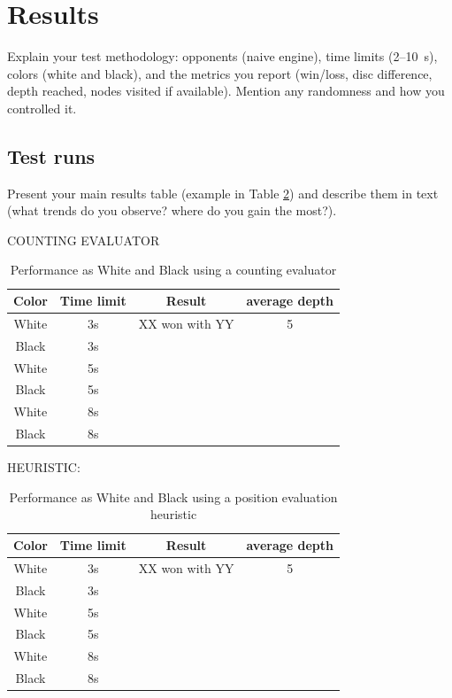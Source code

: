 \documentclass[10pt, titlepage, oneside, a4paper]{article}
\begin{document}
\section{Results}
\label{sec:results}
Explain your test methodology: opponents (naive engine), time limits (2--10~s), colors (white and black), and the metrics you report (win/loss, disc difference, depth reached, nodes visited if available).
Mention any randomness and how you controlled it.


\subsection{Test runs}
\label{sec:testruns}
Present your main results table (example in Table \ref{tab:othello-results}) and describe them in text (what trends do you observe? where do you gain the most?).

COUNTING EVALUATOR

\begin{table}[h]
    \centering
    \caption{Performance as White and Black using a counting evaluator}
    \begin{tabular}{cccc}
    \hline
    \textbf{Color} & \textbf{Time limit} & \textbf{Result}&\textbf{ average depth} \\
    \hline
    White & 3s & XX won with YY & 5\\ 
    Black & 3s &  &\\
    White & 5s &  &\\
    Black & 5s &  &\\
    White & 8s &  &\\
    Black & 8s &  &\\
    \hline
    \end{tabular}    
    \label{tab:othello-results}
\end{table}

HEURISTIC:

\begin{table}[h]
    \centering
    \caption{Performance as White and Black using a position evaluation heuristic}
    \begin{tabular}{cccc}
    \hline
    \textbf{Color} & \textbf{Time limit} & \textbf{Result}&\textbf{ average depth} \\
    \hline
    White & 3s & XX won with YY & 5\\ 
    Black & 3s &  &\\
    White & 5s &  &\\
    Black & 5s &  &\\
    White & 8s &  &\\
    Black & 8s &  &\\
    \hline
    \end{tabular}    
    \label{tab:othello-results}
\end{table}
\end{document}
